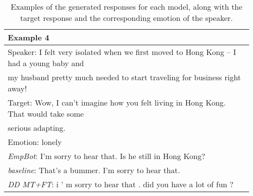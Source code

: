 \documentclass[11pt]{article}
\begin{document}
\begin{table*}[t!]
\begin{tabularx}{0.9\textwidth}{l}
\toprule
\textbf{Example 4} \\
\hline
Speaker: I felt very isolated when we first moved to Hong Kong -- I had a young baby and \\ my husband pretty much needed to start traveling for business right away!\\\hline
Target: Wow, I can't imagine how you felt living in Hong Kong. That would take some\\ serious adapting.\\
Emotion: lonely\\ \hline
\textit{EmpBot}: I'm sorry to hear that. Is he still in Hong Kong?\\
\textit{baseline}: That's a bummer. I'm sorry to hear that.\\
\textit{DD MT+FT}: i ' m sorry to hear that . did you have a lot of fun ?\\
\end{tabularx}
\caption{Examples of the generated responses for each model, along with the target response and the corresponding emotion of the speaker.}
\label{tab:examples}
\end{table*}
\end{document}
